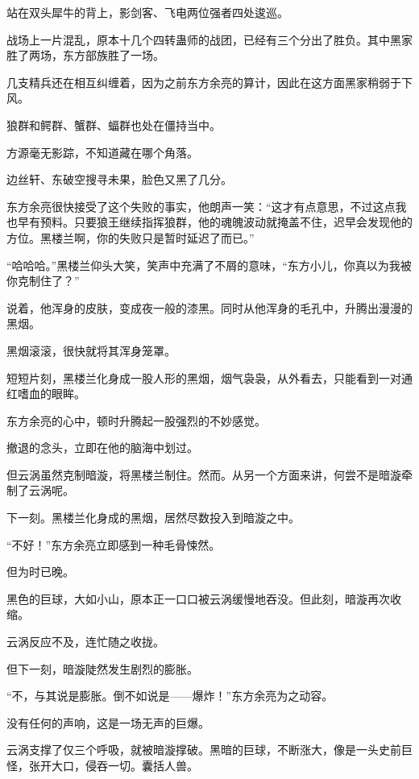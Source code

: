 
\begin{this_body}

站在双头犀牛的背上，影剑客、飞电两位强者四处逡巡。

战场上一片混乱，原本十几个四转蛊师的战团，已经有三个分出了胜负。其中黑家胜了两场，东方部族胜了一场。

几支精兵还在相互纠缠着，因为之前东方余亮的算计，因此在这方面黑家稍弱于下风。

狼群和鳄群、蟹群、蝠群也处在僵持当中。

方源毫无影踪，不知道藏在哪个角落。

边丝轩、东破空搜寻未果，脸色又黑了几分。

东方余亮很快接受了这个失败的事实，他朗声一笑：“这才有点意思，不过这点我也早有预料。只要狼王继续指挥狼群，他的魂魄波动就掩盖不住，迟早会发现他的方位。黑楼兰啊，你的失败只是暂时延迟了而已。”

“哈哈哈。”黑楼兰仰头大笑，笑声中充满了不屑的意味，“东方小儿，你真以为我被你克制住了？”

说着，他浑身的皮肤，变成夜一般的漆黑。同时从他浑身的毛孔中，升腾出漫漫的黑烟。

黑烟滚滚，很快就将其浑身笼罩。

短短片刻，黑楼兰化身成一股人形的黑烟，烟气袅袅，从外看去，只能看到一对通红嗜血的眼眸。

东方余亮的心中，顿时升腾起一股强烈的不妙感觉。

撤退的念头，立即在他的脑海中划过。

但云涡虽然克制暗漩，将黑楼兰制住。然而。从另一个方面来讲，何尝不是暗漩牵制了云涡呢。

下一刻。黑楼兰化身成的黑烟，居然尽数投入到暗漩之中。

“不好！”东方余亮立即感到一种毛骨悚然。

但为时已晚。

黑色的巨球，大如小山，原本正一口口被云涡缓慢地吞没。但此刻，暗漩再次收缩。

云涡反应不及，连忙随之收拢。

但下一刻，暗漩陡然发生剧烈的膨胀。

“不，与其说是膨胀。倒不如说是——爆炸！”东方余亮为之动容。

没有任何的声响，这是一场无声的巨爆。

云涡支撑了仅三个呼吸，就被暗漩撑破。黑暗的巨球，不断涨大，像是一头史前巨怪，张开大口，侵吞一切。囊括人兽。


\end{this_body}
